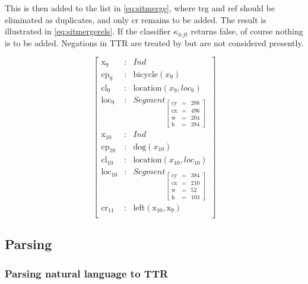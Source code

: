 \documentclass[11pt, a4paper]{article}
\begin{document}
This is then added to the list in \autoref{eq:sitmerge}, where $\text{trg}$ and $\text{ref}$ should be eliminated as duplicates, and only $\text{cr}$ remains to be added.
The result is illustrated in \ref{eq:sitmergerels}.
If the classifier $\kappa_{left}$ returns false, of course nothing is to be added.
Negations in TTR are treated by \cite{CooperNegationdialogue2018} but are not considered presently.

\begin{equation}\label{eq:sitmergerels}
\left[\begin{array}{rcl}
\text{x}_\text{9} &:& Ind\\
\text{cp}_\text{9} &:& \text{bicycle}(x_{9})\\
\text{cl}_\text{9} &:& \text{location}(x_{9}, loc_{9})\\
\text{loc}_\text{9} &:& Segment_{\left[\begin{array}{rcl}
	\text{cy} &=& 288\\
	\text{cx} &=& 496\\
	\text{w} &=& 204\\
	\text{h} &=& 284
	\end{array}\right]}\\
\text{x}_\text{10} &:& Ind\\
\text{cp}_\text{10} &:& \text{dog}(x_{10})\\
\text{cl}_\text{10} &:& \text{location}(x_{10}, loc_{10})\\
\text{loc}_\text{10} &:& Segment_{\left[\begin{array}{rcl}
	\text{cy} &=& 384\\
	\text{cx} &=& 210\\
	\text{w} &=& 52\\
	\text{h} &=& 103
	\end{array}\right]}\\
\text{cr}_\text{11} &:& \text{left}(\text{x}_{10}, \text{x}_9)\\
\end{array}\right]\end{equation}


\subsection{Parsing}

\subsubsection{Parsing natural language to TTR}
\end{document}
